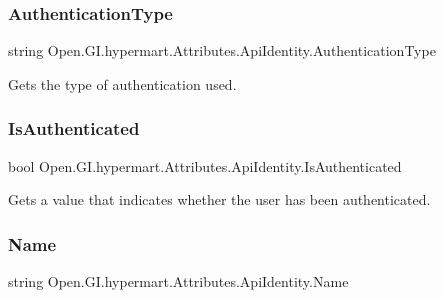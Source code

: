 \subsubsection{\texorpdfstring{Authentication\+Type}{AuthenticationType}}
{\footnotesize\ttfamily string Open.\+G\+I.\+hypermart.\+Attributes.\+Api\+Identity.\+Authentication\+Type\hspace{0.3cm}{\ttfamily [get]}}



Gets the type of authentication used. 

\hypertarget{class_open_1_1_g_i_1_1hypermart_1_1_attributes_1_1_api_identity_a3407b6da66e2ed782c6f88456b71335f}{}\label{class_open_1_1_g_i_1_1hypermart_1_1_attributes_1_1_api_identity_a3407b6da66e2ed782c6f88456b71335f} 
\subsubsection{\texorpdfstring{Is\+Authenticated}{IsAuthenticated}}
{\footnotesize\ttfamily bool Open.\+G\+I.\+hypermart.\+Attributes.\+Api\+Identity.\+Is\+Authenticated\hspace{0.3cm}{\ttfamily [get]}}



Gets a value that indicates whether the user has been authenticated. 

\hypertarget{class_open_1_1_g_i_1_1hypermart_1_1_attributes_1_1_api_identity_aec1f85ea14352e908d2cbe7e66e27913}{}\label{class_open_1_1_g_i_1_1hypermart_1_1_attributes_1_1_api_identity_aec1f85ea14352e908d2cbe7e66e27913} 
\subsubsection{\texorpdfstring{Name}{Name}}
{\footnotesize\ttfamily string Open.\+G\+I.\+hypermart.\+Attributes.\+Api\+Identity.\+Name\hspace{0.3cm}{\ttfamily [get]}}



